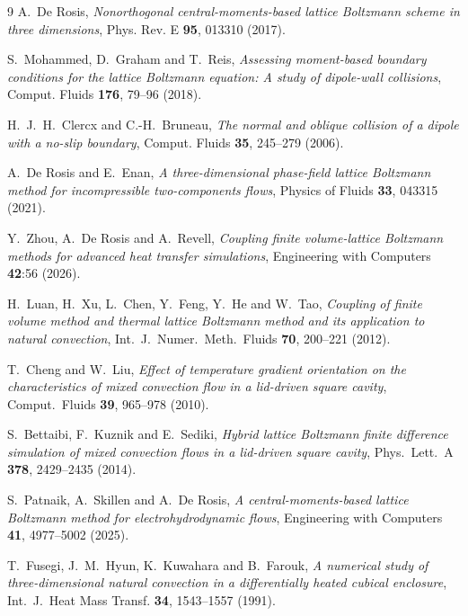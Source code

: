 \documentclass[11pt,a4paper]{article}
\begin{document}
\begin{thebibliography}{9}
 A.~De Rosis,
  \emph{Nonorthogonal central-moments-based lattice Boltzmann scheme in three
  dimensions}, Phys. Rev. E \textbf{95}, 013310 (2017).

 S.~Mohammed, D.~Graham and T.~Reis,
  \emph{Assessing moment-based boundary conditions for the lattice Boltzmann
  equation: A study of dipole-wall collisions},
  Comput. Fluids \textbf{176}, 79--96 (2018).

 H.~J.~H.~Clercx and C.-H.~Bruneau,
  \emph{The normal and oblique collision of a dipole with a no-slip boundary},
  Comput. Fluids \textbf{35}, 245--279 (2006).

 A.~De Rosis and E.~Enan,
  \emph{A three-dimensional phase-field lattice Boltzmann method for
  incompressible two-components flows}, Physics of Fluids \textbf{33},
  043315 (2021).

 Y.~Zhou, A.~De Rosis and A.~Revell,
  \emph{Coupling finite volume-lattice Boltzmann methods for advanced heat
  transfer simulations}, Engineering with Computers \textbf{42}:56 (2026).

 H.~Luan, H.~Xu, L.~Chen, Y.~Feng, Y.~He and W.~Tao,
  \emph{Coupling of finite volume method and thermal lattice Boltzmann method
  and its application to natural convection},
  Int.~J.~Numer.~Meth.~Fluids \textbf{70}, 200--221 (2012).

 T.~Cheng and W.~Liu,
  \emph{Effect of temperature gradient orientation on the characteristics of
  mixed convection flow in a lid-driven square cavity},
  Comput.~Fluids \textbf{39}, 965--978 (2010).

 S.~Bettaibi, F.~Kuznik and E.~Sediki,
  \emph{Hybrid lattice Boltzmann finite difference simulation of mixed
  convection flows in a lid-driven square cavity},
  Phys.~Lett.~A \textbf{378}, 2429--2435 (2014).

 S.~Patnaik, A.~Skillen and A.~De Rosis,
  \emph{A central-moments-based lattice Boltzmann method for electrohydrodynamic
  flows}, Engineering with Computers \textbf{41}, 4977--5002 (2025).

 T.~Fusegi, J.~M.~Hyun, K.~Kuwahara and B.~Farouk,
  \emph{A numerical study of three-dimensional natural convection in a
  differentially heated cubical enclosure},
  Int.~J.~Heat Mass Transf. \textbf{34}, 1543--1557 (1991).

\end{thebibliography}
\end{document}
